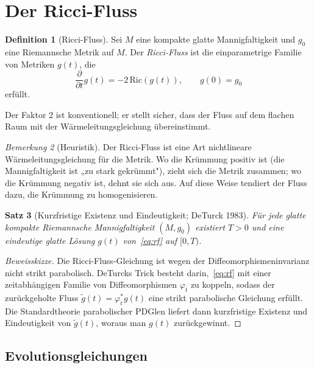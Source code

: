 \documentclass[12pt,a4paper]{amsart}
\newtheorem{theorem}{Satz}[section]
\theoremstyle{definition}
\newtheorem{definition}[theorem]{Definition}
\theoremstyle{remark}
\newtheorem{bemerkung}[theorem]{Bemerkung}
\newcommand{\Ric}{\mathrm{Ric}}
\begin{document}
\section{Der Ricci-Fluss}
\label{sec:rf}

\begin{definition}[Ricci-Fluss]
Sei $M$ eine kompakte glatte Mannigfaltigkeit und $g_0$ eine Riemannsche
Metrik auf $M$.  Der \emph{Ricci-Fluss} ist die einparametrige Familie von
Metriken $g(t)$, die
\begin{equation}
  \label{eq:rf}
  \frac{\partial}{\partial t} g(t) = -2\,\Ric(g(t)), \qquad g(0) = g_0
\end{equation}
erfüllt.
\end{definition}

Der Faktor $2$ ist konventionell; er stellt sicher, dass der Fluss auf dem
flachen Raum mit der Wärmeleitungsgleichung übereinstimmt.

\begin{bemerkung}[Heuristik]
Der Ricci-Fluss ist eine Art nichtlineare Wärmeleitungsgleichung für die Metrik.
Wo die Krümmung positiv ist (die Mannigfaltigkeit ist „zu stark gekrümmt"),
zieht sich die Metrik zusammen; wo die Krümmung negativ ist, dehnt sie sich aus.
Auf diese Weise tendiert der Fluss dazu, die Krümmung zu homogenisieren.
\end{bemerkung}

\begin{theorem}[Kurzfristige Existenz und Eindeutigkeit; DeTurck 1983]
\label{thm:ste}
Für jede glatte kompakte Riemannsche Mannigfaltigkeit $(M,g_0)$ existiert
$T > 0$ und eine eindeutige glatte Lösung $g(t)$ von~\eqref{eq:rf} auf
$[0,T)$.
\end{theorem}

\begin{proof}[Beweisskizze]
Die Ricci-Fluss-Gleichung ist wegen der Diffeomorphismeninvarianz nicht
strikt parabolisch.  DeTurcks Trick besteht darin,~\eqref{eq:rf} mit einer
zeitabhängigen Familie von Diffeomorphismen $\varphi_t$ zu koppeln, sodass
der zurückgeholte Fluss $\tilde g(t) = \varphi_t^* g(t)$ eine strikt
parabolische Gleichung erfüllt.  Die Standardtheorie parabolischer PDGlen
liefert dann kurzfristige Existenz und Eindeutigkeit von $\tilde g(t)$,
woraus man $g(t)$ zurückgewinnt.
\end{proof}

\subsection{Evolutionsgleichungen}
\end{document}
